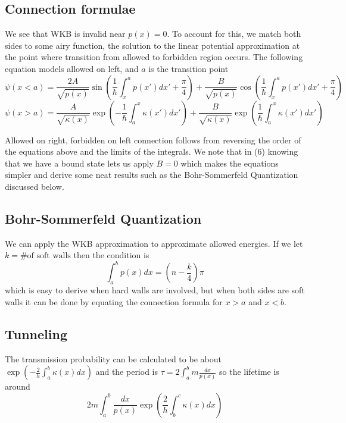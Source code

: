 \documentclass{article}
\begin{document}
\subsection{Connection formulae}
We see that WKB is invalid near $p(x) = 0$. To account for this, we match both sides to some airy function, the solution to the linear potential approximation at the point where transition from allowed to forbidden region occurs. The following equation models allowed on left, and $a$ is the transition point
\begin{equation}
\boxed{
\psi(x<a) = \frac{2A}{\sqrt{p(x)}}\sin\left(\frac{1}{\hbar} \int_{x}^{a} p(x') dx' + \frac{\pi}{4}\right)+\frac{B}{\sqrt{p(x)}}\cos\left(\frac{1}{\hbar} \int_{x}^{a} p(x') dx' + \frac{\pi}{4}\right)
}
\end{equation}
\begin{equation}
\boxed{
\psi(x>a) = \frac{A}{\sqrt{\kappa(x)}}\exp\left(-\frac{1}{\hbar} \int_{a}^{x} \kappa(x') dx' \right)+\frac{B}{\sqrt{\kappa(x)}}\exp\left(\frac{1}{\hbar} \int_{a}^{x} \kappa(x') dx' \right)
}
\end{equation}

Allowed on right, forbidden on left connection follows from reversing the order of the equations above and the limits of the integrals. We note that in (6) knowing that we have a bound state lets us apply $B=0$ which makes the equations simpler and derive some neat results such as the Bohr-Sommerfeld Quantization discussed below.
\subsection{Bohr-Sommerfeld Quantization}
We can apply the WKB approximation to approximate allowed energies. If we let $k = \text{\# of soft walls}$ then the condition is 
\begin{equation}
\boxed{\int_a^b p(x) dx = \left(n-\frac{k}{4}\right)\pi}
\end{equation}
which is easy to derive when hard walls are involved, but when both sides are soft walls it can be done by equating the connection formula for $x>a$ and $x<b$.
\subsection{Tunneling}
The transmission probability can be calculated to be about $\exp\left(-\frac{2}{h} \int_a^b \kappa(x) dx\right)$ and the period is $\tau=2\int_a^b m\frac{dx}{p(x)}$ so the lifetime is around
\begin{equation}
\boxed{2m\int_a^b \frac{dx}{p(x)}\exp\left(\frac{2}{h}\int_b^c \kappa(x) dx\right)}
\end{equation}
\end{document}
